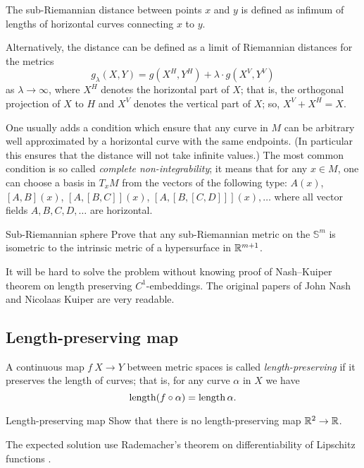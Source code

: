 The sub-Riemannian distance between points $x$ and $y$ is defined as infimum of lengths of horizontal curves connecting $x$ to $y$.

Alternatively, the distance can be defined as a limit of Riemannian distances 
for the metrics 
\[g_\lambda(X,Y)=g(X^H,Y^H)+\lambda\cdot g(X^V,Y^V)\] 
as $\lambda\to \infty$,
where $X^H$ denotes the horizontal part of $X$;
that is, the orthogonal projection of $X$ to $H$
and $X^V$ denotes the vertical part of $X$;
so, $X^V+X^H=X$.

One usually adds a condition which ensure that any curve in $M$ can be arbitrary well approximated by a horizontal curve with the same endpoints.
(In particular this ensures that the distance will not take infinite values.)
The most common condition is so called  {}\emph{complete non-integrability};
it means that for any $x\in M$, 
one can choose a basis in $T_xM$
from the vectors of the following type:
$A(x)$, $[A,B](x)$, $[A,[B,C]](x)$, $[A,[B,[C,D]]](x),\dots$ where all vector fields $A,B,C,D, \dots$ are horizontal.

\begin{pr}{\thm}{Sub-Riemannian sphere}\label{sub-Riemannian} 
Prove that any sub-Riemannian metric 
on the $\mathbb{S}^m$ is isometric to the intrinsic metric of a hypersurface in $\mathbb{R}^{m+1}$.
\end{pr}


It will be hard to solve the problem without knowing proof of Nash--Kuiper theorem on length preserving $C^1$-embeddings.
The original papers of John Nash 
and Nicolaas Kuiper \cite[see][]{nash,kuiper} are very readable.

\subsection*{Length-preserving map\thm}

A continuous map $f\:X\to Y$ between metric spaces is called \emph{length-preserving} if it preserves the length of curves; 
that is, for any curve $\alpha$ in $X$ we have
\[\operatorname{\rm length}(f\circ\alpha)=\operatorname{\rm length}\alpha.\]

\begin{pr}{\thm}{Length-preserving map}\label{two2one} 
Show that there is no length-preserving map $\mathbb{R}^2\to \mathbb{R}$.
\end{pr}

The expected solution use Rademacher's theorem on differentiability of Lipschitz functions \cite[see][]{rademacher}. 



